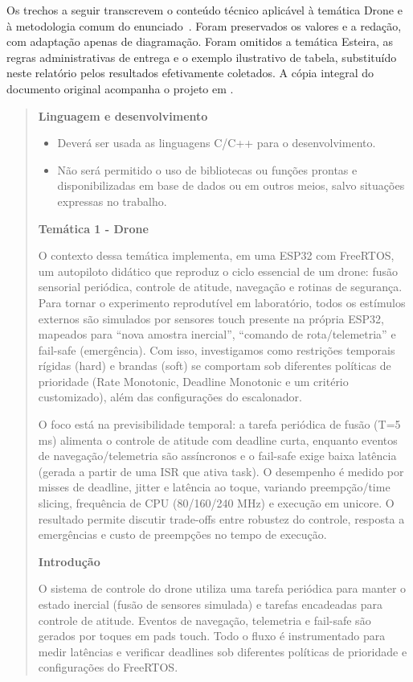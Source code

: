 Os trechos a seguir transcrevem o conteúdo técnico aplicável à temática Drone e à metodologia comum do enunciado~\cite{viel_enunciado}. Foram preservados os valores e a redação, com adaptação apenas de diagramação. Foram omitidos a temática Esteira, as regras administrativas de entrega e o exemplo ilustrativo de tabela, substituído neste relatório pelos resultados efetivamente coletados. A cópia integral do documento original acompanha o projeto em .

\begin{quote}\small
\textbf{Linguagem e desenvolvimento}
\begin{itemize}
\item Deverá ser usada as linguagens C/C++ para o desenvolvimento.
\item Não será permitido o uso de bibliotecas ou funções prontas e disponibilizadas em base de dados ou em outros meios, salvo situações expressas no trabalho.
\end{itemize}

\textbf{Temática 1 - Drone}

O contexto dessa temática implementa, em uma ESP32 com FreeRTOS, um autopiloto didático que reproduz o ciclo essencial de um drone: fusão sensorial periódica, controle de atitude, navegação e rotinas de segurança. Para tornar o experimento reprodutível em laboratório, todos os estímulos externos são simulados por sensores touch presente na própria ESP32, mapeados para ``nova amostra inercial'', ``comando de rota/telemetria'' e fail-safe (emergência). Com isso, investigamos como restrições temporais rígidas (hard) e brandas (soft) se comportam sob diferentes políticas de prioridade (Rate Monotonic, Deadline Monotonic e um critério customizado), além das configurações do escalonador.

O foco está na previsibilidade temporal: a tarefa periódica de fusão (T=5 ms) alimenta o controle de atitude com deadline curta, enquanto eventos de navegação/telemetria são assíncronos e o fail-safe exige baixa latência (gerada a partir de uma ISR que ativa task). O desempenho é medido por misses de deadline, jitter e latência ao toque, variando preempção/time slicing, frequência de CPU (80/160/240 MHz) e execução em unicore. O resultado permite discutir trade-offs entre robustez do controle, resposta a emergências e custo de preempções no tempo de execução.

\textbf{Introdução}

O sistema de controle do drone utiliza uma tarefa periódica para manter o estado inercial (fusão de sensores simulada) e tarefas encadeadas para controle de atitude. Eventos de navegação, telemetria e fail-safe são gerados por toques em pads touch. Todo o fluxo é instrumentado para medir latências e verificar deadlines sob diferentes políticas de prioridade e configurações do FreeRTOS.


\end{quote}
